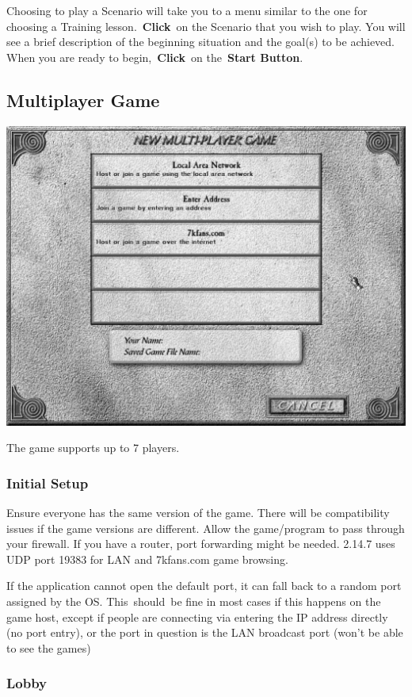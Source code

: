 Choosing to play a Scenario will take you to a menu similar to the one for choosing a Training lesson. \textbf{Click} on the Scenario that you wish to play. You will see a brief description of the beginning situation and the goal(s) to be achieved. When you are ready to begin, \textbf{Click} on the \textbf{Start Button}.

\subsection{Multiplayer Game} 

\begin{center}
	\includegraphics[width=0.7\linewidth]{Imultiplayer}
\end{center}

The game supports up to 7 players.

\subsubsection{Initial Setup}

Ensure everyone has the same version of the game. There will be compatibility issues if the game versions are different. Allow the game/program to pass through your firewall. If you have a router, port forwarding might be needed. 2.14.7 uses UDP port 19383 for LAN and 7kfans.com game browsing.

If the application cannot open the default port, it can fall back to a random port assigned by the OS. This should be fine in most cases if this happens on the game host, except if people are connecting via entering the IP address directly (no port entry), or the port in question is the LAN broadcast port (won't be able to see the games)

\subsubsection{Lobby }

